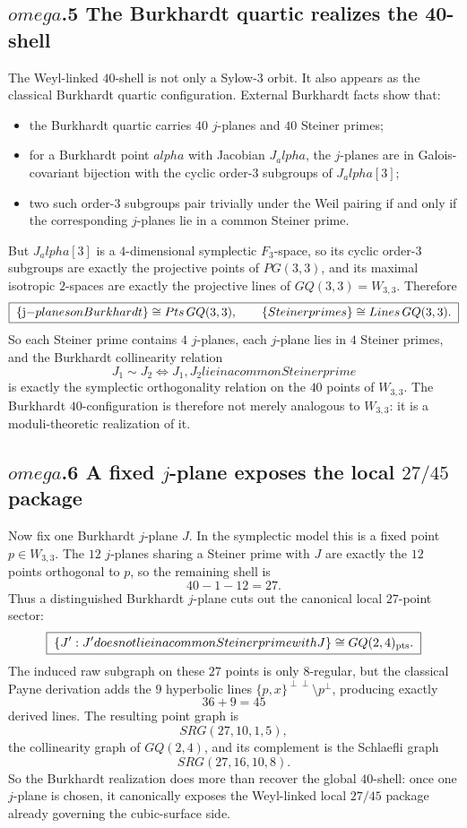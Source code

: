 \documentclass[12pt,a4paper]{article}
\def\mathbb#1{#1}%
\def\mathrm#1{#1}%
\def\text#1{#1}%
\def\omega{omega}%
\def\alpha{alpha}%
\theoremstyle{definition}
\newcommand{\SRG}{\mathrm{SRG}}
\newcommand{\GQ}{\mathrm{GQ}}
\newcommand{\PG}{\mathrm{PG}}
\newcommand{\FF}{\mathbb{F}}
\begin{document}
\subsection*{$\omega$.5 \quad The Burkhardt quartic realizes the 40-shell}
The Weyl-linked $40$-shell is not only a Sylow-$3$ orbit.  It also appears
as the classical Burkhardt quartic configuration.  External Burkhardt facts
show that:
\begin{itemize}[leftmargin=2em,nosep]
\item the Burkhardt quartic carries $40$ $j$-planes and $40$ Steiner primes;
\item for a Burkhardt point $\alpha$ with Jacobian $J_\alpha$, the $j$-planes
are in Galois-covariant bijection with the cyclic order-$3$ subgroups of
$J_\alpha[3]$;
\item two such order-$3$ subgroups pair trivially under the Weil pairing if
and only if the corresponding $j$-planes lie in a common Steiner prime.
\end{itemize}
But $J_\alpha[3]$ is a $4$-dimensional symplectic $\FF_3$-space, so its cyclic
order-$3$ subgroups are exactly the projective points of $\PG(3,3)$, and its
maximal isotropic $2$-spaces are exactly the projective lines of
$\GQ(3,3)=W_{3,3}$.  Therefore
\[
\boxed{\;
\{\text{$j$-planes on Burkhardt}\}
\cong \mathrm{Pts}\,\GQ(3,3),
\qquad
\{\text{Steiner primes}\}
\cong \mathrm{Lines}\,\GQ(3,3).
\;}
\]
So each Steiner prime contains $4$ $j$-planes, each $j$-plane lies in $4$
Steiner primes, and the Burkhardt collinearity relation
\[ J_1 \sim J_2 \iff J_1,J_2 \text{ lie in a common Steiner prime} \]
is exactly the symplectic orthogonality relation on the $40$ points of
$W_{3,3}$.  The Burkhardt $40$-configuration is therefore not merely analogous
to $W_{3,3}$: it is a moduli-theoretic realization of it.

\subsection*{$\omega$.6 \quad A fixed $j$-plane exposes the local $27/45$ package}
Now fix one Burkhardt $j$-plane $J$.  In the symplectic model this is a fixed
point $p\in W_{3,3}$.  The $12$ $j$-planes sharing a Steiner prime with $J$
are exactly the $12$ points orthogonal to $p$, so the remaining shell is
\[
40 - 1 - 12 = 27.
\]
Thus a distinguished Burkhardt $j$-plane cuts out the canonical local
$27$-point sector:
\[
\boxed{\;\{J' : J' \text{ does not lie in a common Steiner prime with } J\}
\cong \GQ(2,4)_{\rm pts}.\;}
\]
The induced raw subgraph on these $27$ points is only $8$-regular, but the
classical Payne derivation adds the $9$ hyperbolic lines
${\{p,x\}^{\perp\perp}\setminus p^{\perp}}$, producing exactly
\[
36 + 9 = 45
\]
derived lines.  The resulting point graph is
\[
\boxed{\;\SRG(27,10,1,5),\;}
\]
the collinearity graph of $\GQ(2,4)$, and its complement is the Schlaefli graph
\[
\boxed{\;\SRG(27,16,10,8).\;}
\]
So the Burkhardt realization does more than recover the global $40$-shell: once
one $j$-plane is chosen, it canonically exposes the Weyl-linked local
$27/45$ package already governing the cubic-surface side.
\end{document}
